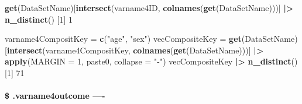\documentclass[
]{article}
\newenvironment{Shaded}{\begin{snugshade}}{\end{snugshade}}
\newcommand{\AttributeTok}[1]{\textcolor[rgb]{0.13,0.29,0.53}{#1}}
\newcommand{\DecValTok}[1]{\textcolor[rgb]{0.00,0.00,0.81}{#1}}
\newcommand{\FunctionTok}[1]{\textcolor[rgb]{0.13,0.29,0.53}{\textbf{#1}}}
\newcommand{\NormalTok}[1]{#1}
\newcommand{\OtherTok}[1]{\textcolor[rgb]{0.56,0.35,0.01}{#1}}
\newcommand{\SpecialCharTok}[1]{\textcolor[rgb]{0.81,0.36,0.00}{\textbf{#1}}}
\newcommand{\StringTok}[1]{\textcolor[rgb]{0.31,0.60,0.02}{#1}}
\begin{document}
\begin{Shaded}
\begin{Highlighting}[]
\FunctionTok{get}\NormalTok{(DataSetName)[}\FunctionTok{intersect}\NormalTok{(varname4ID, }\FunctionTok{colnames}\NormalTok{(}\FunctionTok{get}\NormalTok{(DataSetName)))] }\SpecialCharTok{|\textgreater{}} \FunctionTok{n\_distinct}\NormalTok{()}
\NormalTok{[}\DecValTok{1}\NormalTok{] }\DecValTok{1}
\end{Highlighting}
\end{Shaded}

\begin{Shaded}
\end{Shaded}

\begin{Shaded}
\begin{Highlighting}[]
  
\NormalTok{varname4CompositKey }\OtherTok{=} \FunctionTok{c}\NormalTok{(}\StringTok{"age"}\NormalTok{, }\StringTok{"sex"}\NormalTok{)}
\NormalTok{vecCompositeKey }\OtherTok{=} \FunctionTok{get}\NormalTok{(DataSetName)[}\FunctionTok{intersect}\NormalTok{(varname4CompositKey, }\FunctionTok{colnames}\NormalTok{(}\FunctionTok{get}\NormalTok{(DataSetName)))] }\SpecialCharTok{|\textgreater{}} \FunctionTok{apply}\NormalTok{(}\AttributeTok{MARGIN =} \DecValTok{1}\NormalTok{, paste0, }\AttributeTok{collapse =} \StringTok{"{-}"}\NormalTok{)}
\NormalTok{vecCompositeKey }\SpecialCharTok{|\textgreater{}} \FunctionTok{n\_distinct}\NormalTok{()}
\NormalTok{[}\DecValTok{1}\NormalTok{] }\DecValTok{71}
\end{Highlighting}
\end{Shaded}

\hypertarget{varname4outcome--}{%
\paragraph{\$ .varname4outcome ----}\label{varname4outcome--}}
\end{document}
